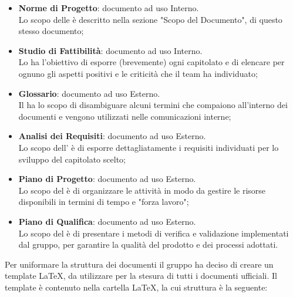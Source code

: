 	\begin{itemize}
	\item \textbf{Norme di Progetto}:
	documento ad uso Interno.\\
	Lo scopo delle \textit{\NdP{}} è descritto nella sezione  "Scopo del Documento", di questo stesso documento;
	
	\item \textbf{Studio di Fattibilità}:
	documento ad uso Interno.\\
	Lo \textit{\SdF{}} ha l'obiettivo di esporre (brevemente) ogni capitolato e di elencare per ognuno gli aspetti positivi e le criticità che il team ha individuato;
	
	\item \textbf{Glossario}:
	documento ad uso Esterno.\\
	Il \Glossario{}  ha lo scopo di disambiguare alcuni termini che compaiono all'interno dei documenti e vengono utilizzati nelle comunicazioni interne;
	
	\item \textbf{Analisi dei Requisiti}:
	documento ad uso Esterno.\\
	Lo  scopo  dell'\textit{\AdR{}} è di esporre dettagliatamente i requisiti individuati per lo sviluppo del capitolato scelto;
	
	\item \textbf{Piano di Progetto}:
	documento ad uso Esterno.\\
	Lo scopo del \textit{\PdP{}} è di organizzare le attività in modo da gestire le risorse disponibili in termini di tempo e "forza lavoro";
	
	\item \textbf{Piano di Qualifica}:
	documento ad uso Esterno.\\
	Lo scopo del \textit{\PdQ{}} è di presentare i metodi di verifica e validazione implementati dal gruppo, per garantire la qualità del prodotto e dei processi adottati.
	\end{itemize}
        Per uniformare la struttura dei documenti il gruppo ha deciso di creare un template \LaTeX{}, da utilizzare per la stesura di tutti i documenti ufficiali. Il template è contenuto nella cartella \LaTeX{}, la cui struttura è la seguente:
